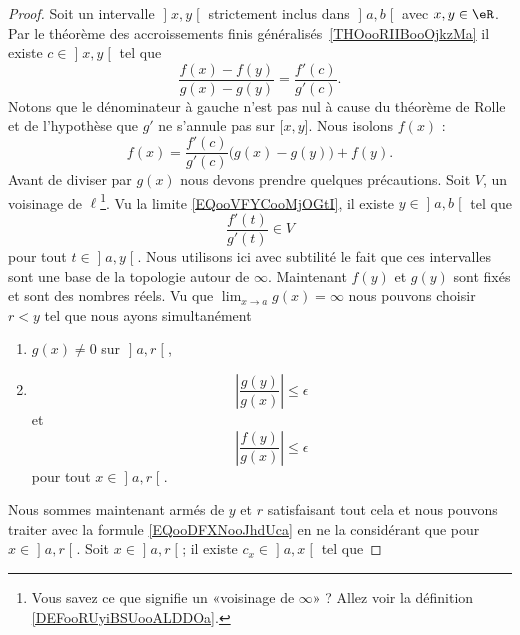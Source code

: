 \begin{proof}
	Soit un intervalle \( \mathopen] x , y \mathclose[\) strictement inclus dans \( \mathopen] a , b \mathclose[\) avec \( x,y\in\eR\). Par le théorème des accroissements finis généralisés~\ref{THOooRIIBooOjkzMa} il existe \( c\in \mathopen] x , y \mathclose[\) tel que
		\begin{equation}
			\frac{ f(x)-f(y) }{ g(x)-g(y) }=\frac{ f'(c) }{ g'(c) }.
		\end{equation}
		Notons que le dénominateur à gauche n'est pas nul à cause du théorème de Rolle et de l'hypothèse que \( g'\) ne s'annule pas sur \( \mathopen[ x , y \mathclose]\). Nous isolons \( f(x)\) :
		\begin{equation}        \label{EQooDFXNooJhdUca}
			f(x)=\frac{ f'(c) }{ g'(c) }\Big( g(x)-g(y) \Big)+f(y).
		\end{equation}
		Avant de diviser par \( g(x)\) nous devons prendre quelques précautions. Soit \( V\), un voisinage de \( \ell\)\footnote{Vous savez ce que signifie un «voisinage de \( \infty\)» ? Allez voir la définition \ref{DEFooRUyiBSUooALDDOa}.}. Vu la limite \eqref{EQooVFYCooMjOGtI}, il existe \( y\in \mathopen] a , b \mathclose[\) tel que
		\begin{equation}
			\frac{ f'(t) }{ g'(t) }\in V
		\end{equation}
		pour tout \( t\in \mathopen] a , y \mathclose[\). Nous utilisons ici avec subtilité le fait que ces intervalles sont une base de la topologie autour de \( \infty\). Maintenant \( f(y)\) et \( g(y)\) sont fixés et sont des nombres réels. Vu que \( \lim_{x\to a} g(x)=\infty\) nous pouvons choisir \( r<y\) tel que nous ayons simultanément
		\begin{enumerate}
			\item
			      \( g(x)\neq 0\) sur \( \mathopen] a , r \mathclose[\),
			\item
			      \begin{equation}
				      \left| \frac{ g(y) }{ g(x) } \right| \leq \epsilon
			      \end{equation}
			      et
			      \begin{equation}
				      \left| \frac{ f(y) }{ g(x) } \right| \leq \epsilon
			      \end{equation}
			      pour tout \( x\in \mathopen] a , r \mathclose[\).
		\end{enumerate}
		Nous sommes maintenant armés de \( y\) et \( r\) satisfaisant tout cela et nous pouvons traiter avec la formule \eqref{EQooDFXNooJhdUca} en ne la considérant que pour \( x\in \mathopen] a , r \mathclose[\). Soit \( x\in \mathopen] a , r \mathclose[\); il existe \( c_x\in \mathopen] a , x \mathclose[\) tel que

\end{proof}
